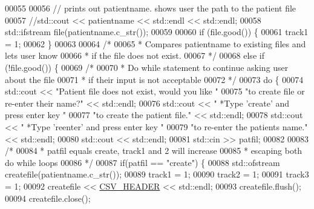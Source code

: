 \begin{DoxyCode}
00055 
00056             \textcolor{comment}{// prints out patientname. shows user the path to the patient file}
00057             \textcolor{comment}{//std::cout << patientname << std::endl << std::endl;}
00058             std::ifstream file(patientname.c\_str());
00059 
00060             \textcolor{keywordflow}{if} (file.good()) \{
00061                 track1 = 1;
00062             \}
00063 
00064             \textcolor{comment}{/*}
00065 \textcolor{comment}{             * Compares patientname to existing files and lets user know}
00066 \textcolor{comment}{             * if the file does not exist.}
00067 \textcolor{comment}{             */}
00068             \textcolor{keywordflow}{else} \textcolor{keywordflow}{if} (!file.good()) \{
00069                 \textcolor{comment}{/* }
00070 \textcolor{comment}{                 * Do while statement to continue asking user about the file}
00071 \textcolor{comment}{                 * if their input is not acceptable}
00072 \textcolor{comment}{                 */} 
00073                 \textcolor{keywordflow}{do} \{
00074                     std::cout << \textcolor{stringliteral}{"Patient file does not exist, would you like "}
00075                         \textcolor{stringliteral}{"to create file or re-enter their name?"} << std::endl;
00076                     std::cout << \textcolor{stringliteral}{"  *Type 'create' and press enter key "}
00077                         \textcolor{stringliteral}{"to create the patient file."} << std::endl;
00078                     std::cout << \textcolor{stringliteral}{"  *Type 'reenter' and press enter key "}
00079                         \textcolor{stringliteral}{"to re-enter the patients name."} << std::endl;
00080                     std::cout << std::endl;
00081                     std::cin >> patfil;
00082 
00083                     \textcolor{comment}{/* }
00084 \textcolor{comment}{                     * patfil equals create, track1 and 2 will increase}
00085 \textcolor{comment}{                     * escaping both do while loops}
00086 \textcolor{comment}{                     */}
00087                     \textcolor{keywordflow}{if}(patfil == \textcolor{stringliteral}{"create"}) \{
00088                         std::ofstream createfile(patientname.c\_str());
00089                         track1 = 1;
00090                         track2 = 1;
00091                         track3 = 1;
00092                         createfile << \hyperlink{definitions_8hpp_ac686b5c4edb9968dade15aad6e58bdca}{CSV\_HEADER} << std::endl;
00093                         createfile.flush();
00094                         createfile.close();

\end{DoxyCode}
